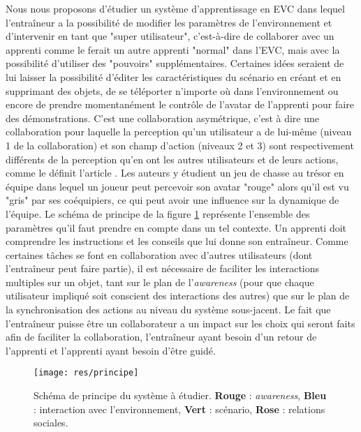 \documentclass[11pt]{article}
\begin{document}
Nous nous proposons d'étudier un système d'apprentissage en EVC dans lequel l'entraîneur a la possibilité de modifier les paramètres de l'environnement et d'intervenir en tant que "super utilisateur", c'est-à-dire de collaborer avec un apprenti comme le ferait un autre apprenti "normal" dans l'EVC, mais avec la possibilité d'utiliser des "pouvoirs" supplémentaires. Certaines idées seraient de lui laisser la possibilité d'éditer les caractéristiques du scénario en créant et en supprimant des objets, de se téléporter n'importe où dans l'environnement ou encore de prendre momentanément le contrôle de l'avatar de l'apprenti pour faire des démonstrations. C'est une collaboration asymétrique, c'est à dire une collaboration pour laquelle la perception qu'un utilisateur a de lui-même (niveau 1 de la collaboration) et son champ d'action (niveaux 2 et 3) sont respectivement différents de la perception qu'en ont les autres utilisateurs et de leurs actions, comme le définit l'article \cite{polly}. Les auteurs y étudient un jeu de chasse au trésor en équipe dans lequel un joueur peut percevoir son avatar "rouge" alors qu'il est vu "gris" par ses coéquipiers, ce qui peut avoir une influence sur la dynamique de l'équipe. Le schéma de principe de la figure \ref{fig:principle} représente l'ensemble des paramètres qu'il faut prendre en compte dans un tel contexte. Un apprenti doit comprendre les instructions et les conseils que lui donne son entraîneur. Comme certaines tâches se font en collaboration avec d'autres utilisateurs (dont l'entraîneur peut faire partie), il est nécessaire de faciliter les interactions multiples sur un objet, tant sur le plan de l'\textit{awareness} (pour que chaque utilisateur impliqué soit conscient des interactions des autres) que sur le plan de la synchronisation des actions au niveau du système sous-jacent. Le fait que l'entraîneur puisse être un collaborateur a un impact sur les choix qui seront faits afin de faciliter la collaboration, l'entraîneur ayant besoin d'un retour de l'apprenti et l'apprenti ayant besoin d'être guidé. 
\\

\begin{figure}[!h]
\centering
\texttt{[image: res/principe]}
\caption{\label{fig:principle}Schéma de principe du système à étudier. \textbf{Rouge} : \textit{awareness}, \textbf{Bleu} : interaction avec l'environnement, \textbf{Vert} : scénario, \textbf{Rose} : relations sociales.}
\end{figure}
\end{document}
